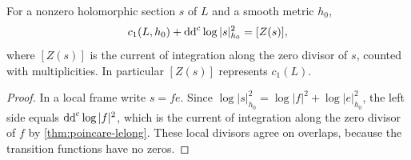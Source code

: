 \begin{proposition}\label{prop:line-bundle-poincare-lelong}
For a nonzero holomorphic section $s$ of $L$ and a smooth metric $h_0$,
\begin{equation}\label{eq:line-bundle-poincare-lelong}
 c_1(L,h_0)+\mathrm{dd}^{\mathrm{c}}\log|s|_{h_0}^2=[Z(s)],
\end{equation}
where $[Z(s)]$ is the current of integration along the zero divisor of $s$, counted with multiplicities. In particular $[Z(s)]$ represents $c_1(L)$.
\end{proposition}
\begin{proof}
In a local frame write $s=fe$. Since $\log|s|_{h_0}^2=\log|f|^2+\log|e|_{h_0}^2$, the left side equals $\mathrm{dd}^{\mathrm{c}}\log|f|^2$, which is the current of integration along the zero divisor of $f$ by \cref{thm:poincare-lelong}. These local divisors agree on overlaps, because the transition functions have no zeros.
\end{proof}

